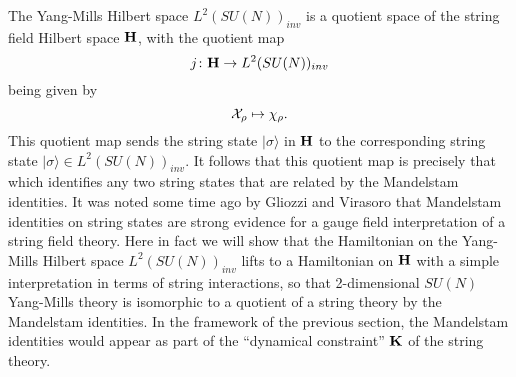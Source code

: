 \documentclass[12pt]{article}
\newcommand{\Chi}{{\cal X}}
\newcommand{\maps}{\colon}
\renewcommand{\H}{{\bf H}}
\newcommand{\K}{{\bf K}}
\begin{document}
The Yang-Mills Hilbert space $L^2(SU(N))_{inv}$ is a quotient space of
the string field Hilbert space $\H$, with the quotient map
\[             j \maps \H \to L^2(SU(N))_{inv}  \]
being given by
\[             \Chi_\rho \mapsto \chi_\rho  .\]
This quotient map sends the string state $|\sigma\rangle$ in $\H$ to the
corresponding string state $|\sigma\rangle \in L^2(SU(N))_{inv}$.
It follows that this quotient map is precisely that which identifies any
two string states that are related by the Mandelstam identities.
It was noted some time ago by Gliozzi and Virasoro \cite{GV}
that Mandelstam identities on string states are strong
evidence for a gauge field interpretation of a string field theory.
Here in fact we will show that the Hamiltonian on the Yang-Mills
Hilbert space $L^2(SU(N))_{inv}$ lifts to a Hamiltonian on $\H$
with a simple interpretation in terms of string interactions, so that
2-dimensional $SU(N)$ Yang-Mills theory is isomorphic to a quotient of
a string theory by the Mandelstam identities.  In the framework of the
previous section, the Mandelstam identities would appear as part of the
``dynamical constraint'' $\K$ of the string theory.
\end{document}
